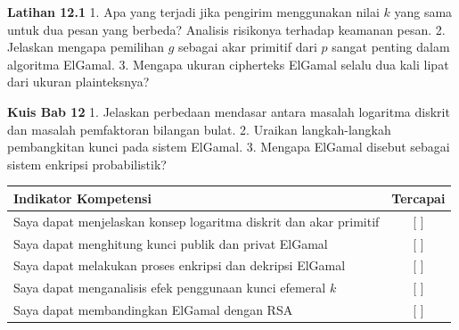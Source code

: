 \documentclass[../main.tex]{subfiles}
\begin{document}
\begin{obereflection}
\textbf{Latihan 12.1}
1. Apa yang terjadi jika pengirim menggunakan nilai $k$ yang sama untuk dua pesan yang berbeda? Analisis risikonya terhadap keamanan pesan.
2. Jelaskan mengapa pemilihan $g$ sebagai akar primitif dari $p$ sangat penting dalam algoritma ElGamal.
3. Mengapa ukuran cipherteks ElGamal selalu dua kali lipat dari ukuran plainteksnya?
\end{obereflection}

\begin{obeassessment}
\textbf{Kuis Bab 12}
1. Jelaskan perbedaan mendasar antara masalah logaritma diskrit dan masalah pemfaktoran bilangan bulat.
2. Uraikan langkah-langkah pembangkitan kunci pada sistem ElGamal.
3. Mengapa ElGamal disebut sebagai sistem enkripsi probabilistik?
\end{obeassessment}

\begin{competencychecklist}
\begin{tabularx}{\linewidth}{|X|c|}
\hline
Indikator Kompetensi & Tercapai \\
\hline
Saya dapat menjelaskan konsep logaritma diskrit dan akar primitif & [ ] \\
\hline
Saya dapat menghitung kunci publik dan privat ElGamal & [ ] \\
\hline
Saya dapat melakukan proses enkripsi dan dekripsi ElGamal & [ ] \\
\hline
Saya dapat menganalisis efek penggunaan kunci efemeral $k$ & [ ] \\
\hline
Saya dapat membandingkan ElGamal dengan RSA & [ ] \\
\hline
\end{tabularx}
\end{competencychecklist}
\end{document}
